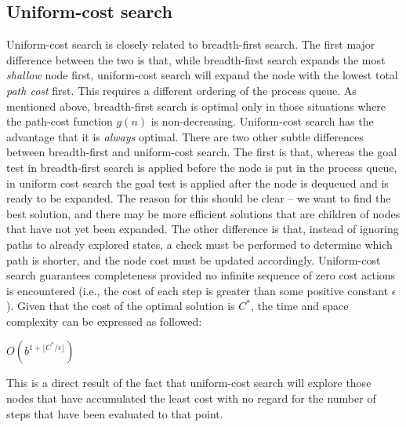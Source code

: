 \documentclass[a4paper,11pt]{report}
\begin{document}
\subsection{Uniform-cost search}
Uniform-cost search is closely related to breadth-first search.  The first
major difference between the two is that, while breadth-first search
expands the most \textit{shallow} node first, uniform-cost search will expand
the node with the lowest total \textit{path cost} first.\cite{norvig} This
requires a different ordering of the process queue.  As mentioned above,
breadth-first search is optimal only in those situations where the path-cost
function $g(n)$ is non-decreasing.  Uniform-cost search has the
advantage that it is \textit{always} optimal.  There are two other subtle
differences between breadth-first and uniform-cost search.  The first is that,
whereas the goal test in breadth-first search is applied before the node is
put in the process queue, in uniform cost search the goal test is applied
after the node is dequeued and is ready to be expanded.\cite{norvig} The reason
for this should be clear -- we want to find the best solution, and there may
be more efficient solutions that are children of nodes that have not yet been
expanded. The other difference is that, instead of ignoring paths to already
explored states, a check must be performed to determine which path is shorter,
and the node cost must be updated accordingly.\cite{norvig} Uniform-cost search
guarantees completeness provided no infinite sequence of zero cost actions is
encountered (i.e., the cost of each step is greater than some positive constant
$\epsilon$).\cite{norvig}  Given that the cost of the optimal solution is $C^*$,
the time and space complexity can be expressed as followed:\vspace{5 mm}

$O(b^{1 + \lfloor C^* / \epsilon \rfloor})$\cite{norvig}\vspace{5mm}

This is a direct result of the fact that uniform-cost search will explore those
nodes that have accumulated the least cost with no regard for the number of
steps that have been evaluated to that point.
\end{document}

